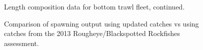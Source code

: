 \documentclass[
]{scrartcl}
\begin{document}
\begin{figure}[H]


\caption{\label{fig-length_flt1_2}Length composition data for bottom
trawl fleet, continued.}

\end{figure}%

\begin{figure}[H]


\caption{\label{fig-Ct_compsSO}Comparison of spawning output using
updated catches vs using catches from the 2013 Rougheye/Blackspotted
Rockfishes assessment.}

\end{figure}%
\end{document}
